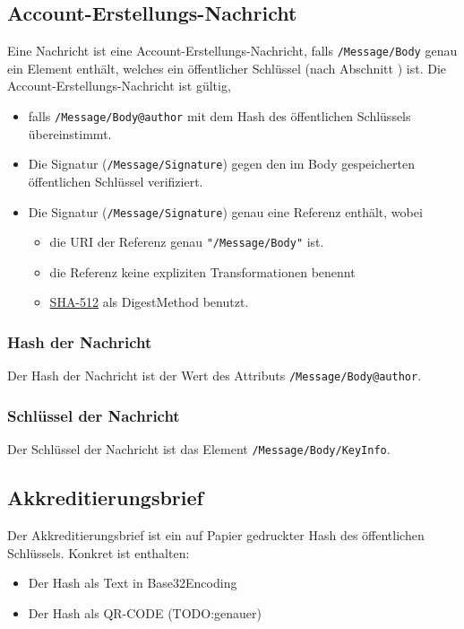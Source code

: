 \documentclass[a4paper,10pt]{article}
\begin{document}
\subsection{Account-Erstellungs-Nachricht}
Eine Nachricht ist eine Account-Erstellungs-Nachricht, falls \texttt{/Message/Body} genau ein Element enthält, welches ein öffentlicher Schlüssel (nach Abschnitt \label{sec:publickKey}) ist. 
Die Account-Erstellungs-Nachricht ist gültig, 
\begin{itemize}
 \item falls \texttt{/Message/Body@author} mit dem Hash des öffentlichen Schlüssels übereinstimmt.
 \item Die Signatur (\texttt{/Message/Signature}) gegen den im Body gespeicherten öffentlichen Schlüssel verifiziert.
 \item Die Signatur (\texttt{/Message/Signature}) genau eine Referenz enthält, wobei
 \begin{itemize}
  \item die URI der Referenz genau \texttt{"/Message/Body"} ist.
  \item die Referenz keine expliziten Transformationen benennt
  \item \href{http://www.w3.org/2001/04/xmlenc#sha512}{SHA-512} als DigestMethod benutzt.
 \end{itemize}
\end{itemize}

\subsubsection{Hash der Nachricht}
Der Hash der Nachricht ist der Wert des Attributs \texttt{/Message/Body@author}.

\subsubsection{Schlüssel der Nachricht}
Der Schlüssel der Nachricht ist das Element \texttt{/Message/Body/KeyInfo}.

\subsection{Akkreditierungsbrief}
Der Akkreditierungsbrief ist ein auf Papier gedruckter Hash des öffentlichen Schlüssels. Konkret ist enthalten:
\begin{itemize}
 \item Der Hash als Text in Base32Encoding
 \item Der Hash als QR-CODE (TODO:genauer)
\end{itemize}
\end{document}
